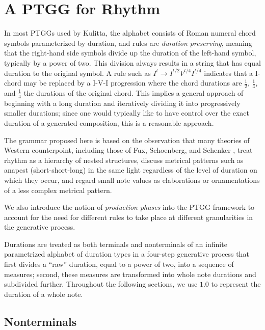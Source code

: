 \documentclass{article}
\begin{document}
\section{A PTGG for Rhythm}


In most PTGGs used by Kulitta, the alphabet consists of Roman numeral chord symbols parameterized by duration, and rules are \emph{duration preserving}, meaning that the right-hand side symbols divide up the duration of the left-hand symbol, typically by a power of two. This division always results in a string that has equal duration to the original symbol. A rule such as $I^{t} \rightarrow I^{t/2} V^{t/4} I^{t/4}$ indicates that a I-chord may be replaced by a I-V-I progression where the chord durations are $\frac{1}{2}$, $\frac{1}{4}$, and $\frac{1}{4}$ the durations of the original chord. This implies a general approach of beginning with a long duration and iteratively dividing it into progressively smaller durations; since one would typically like to have control over the exact duration of a generated composition, this is a reasonable approach.

The grammar proposed here is based on the observation that many theories of Western counterpoint, including those of Fux, Schoenberg, and Schenker \cite{[TO-DO]}, treat rhythm as a hierarchy of nested structures, discuss metrical patterns such as anapest (short-short-long) in the same light regardless of the level of duration on which they occur, and regard small note values as elaborations or ornamentations of a less complex metrical pattern.

We also introduce the notion of \emph{production phases} into the PTGG framework to account for the need for different rules to take place at different granularities in the generative process.

Durations are treated as both terminals and nonterminals of an infinite parametrized alphabet of duration types in a four-step generative process that first divides a “raw” duration, equal to a power of two, into a sequence of measures; second, these measures are transformed into whole note durations and subdivided further. Throughout the following sections, we use $1.0$ to represent the duration of a whole note.

\subsection{Nonterminals}
\end{document}
